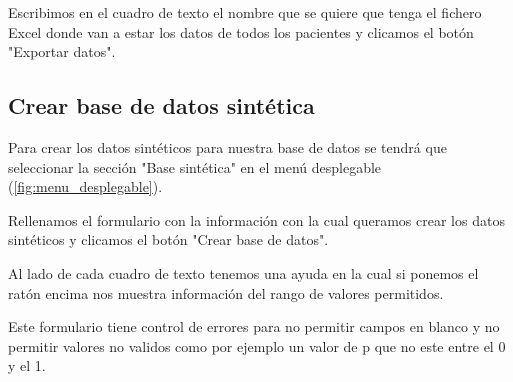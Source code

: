 
Escribimos en el cuadro de texto el nombre que se quiere que tenga el fichero Excel donde van a estar los datos de todos los pacientes y clicamos el botón "{}Exportar datos".


\subsection{Crear base de datos sintética}

Para crear los datos sintéticos para nuestra base de datos se tendrá que seleccionar la sección "Base sintética"{} en el menú desplegable (\ref{fig:menu_desplegable}).


Rellenamos el formulario con la información con la cual queramos crear los datos sintéticos y clicamos el botón "{}Crear base de datos".

Al lado de cada cuadro de texto tenemos una ayuda en la cual si ponemos el ratón encima nos muestra información del rango de valores permitidos.


Este formulario tiene control de errores para no permitir campos en blanco y no permitir valores no validos como por ejemplo un valor de p que no este entre el 0 y el 1.